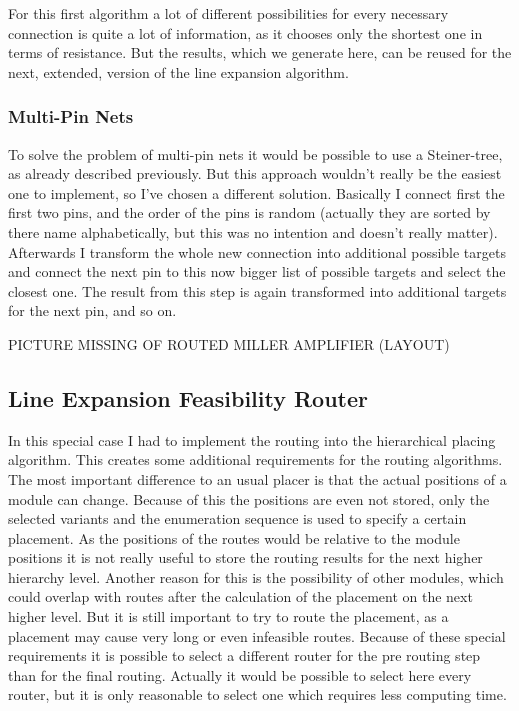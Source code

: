 For this first algorithm a lot of different possibilities for every necessary connection is quite a lot of information, as it chooses only the shortest one in terms of resistance. But the results, which we generate here, can be reused for the next, extended, version of the line expansion algorithm.

\subsubsection{Multi-Pin Nets}
To solve the problem of multi-pin nets it would be possible to use a Steiner-tree, as already described previously. But this approach wouldn't really be the easiest one to implement, so I've chosen a different solution. Basically I connect first the first two pins, and the order of the pins is random (actually they are sorted by there name alphabetically, but this was no intention and doesn't really matter). Afterwards I transform the whole new connection into additional possible targets and connect the next pin to this now bigger list of possible targets and select the closest one. The result from this step is again transformed into additional targets for the next pin, and so on.

PICTURE MISSING OF ROUTED MILLER AMPLIFIER (LAYOUT)

\subsection{Line Expansion Feasibility Router}
In this special case I had to implement the routing into the hierarchical placing algorithm. This creates some additional requirements for the routing algorithms. The most important difference to an usual placer is that the actual positions of a module can change. Because of this the positions are even not stored, only the selected variants and the enumeration sequence is used to specify a certain placement. As the positions of the routes would be relative to the module positions it is not really useful to store the routing results for the next higher hierarchy level. Another reason for this is the possibility of other modules, which could overlap with routes after the calculation of the placement on the next higher level. But it is still important to try to route the placement, as a placement may cause very long or even infeasible routes. Because of these special requirements it is possible to select a different router for the pre routing step than for the final routing. Actually it would be possible to select here every router, but it is only reasonable to select one which requires less computing time.

